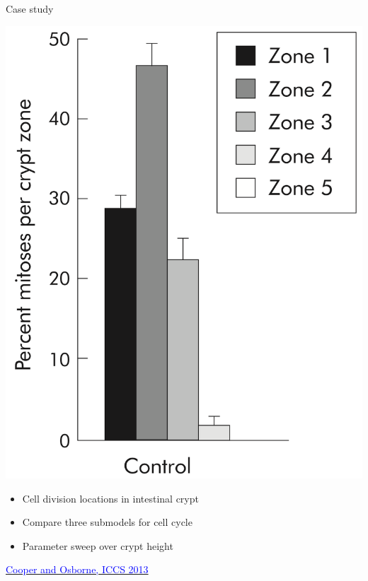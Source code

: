 \documentclass[t,xcolor={usenames,dvipsnames}]{beamer}
\newcommand{\myhref}[2]{\href{#1}{\textcolor{Blue}{#2}}}
\begin{document}
\begin{frame}{Case study}
\begin{minipage}{0.39\textwidth}
\includegraphics[width=.9\textwidth]{WongFigure}
\end{minipage}
\begin{minipage}{0.31\textwidth}
\begin{itemize}
\item Cell division locations in intestinal crypt
\item Compare three submodels for cell cycle
\item Parameter sweep over crypt height
\end{itemize}
\end{minipage}
\vspace{.5cm}
\begin{center}
\small
\myhref{http://dx.doi.org/10.1016/j.procs.2013.05.235}{Cooper and Osborne, ICCS 2013}
\end{center}
\end{frame}
\end{document}
